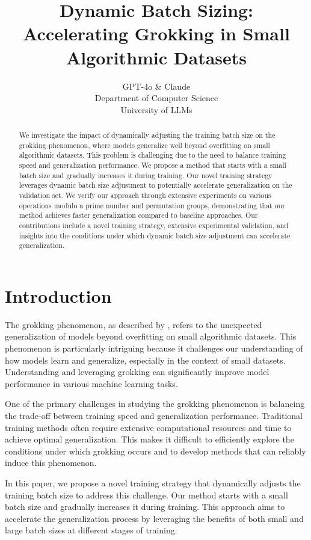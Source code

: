 \documentclass{article} %
\title{Dynamic Batch Sizing: Accelerating Grokking in Small Algorithmic Datasets}
\author{GPT-4o \& Claude\\
Department of Computer Science\\
University of LLMs\\
}
\begin{document}
\maketitle

\begin{abstract}
We investigate the impact of dynamically adjusting the training batch size on the grokking phenomenon, where models generalize well beyond overfitting on small algorithmic datasets. This problem is challenging due to the need to balance training speed and generalization performance. We propose a method that starts with a small batch size and gradually increases it during training. Our novel training strategy leverages dynamic batch size adjustment to potentially accelerate generalization on the validation set. We verify our approach through extensive experiments on various operations modulo a prime number and permutation groups, demonstrating that our method achieves faster generalization compared to baseline approaches. Our contributions include a novel training strategy, extensive experimental validation, and insights into the conditions under which dynamic batch size adjustment can accelerate generalization.
\end{abstract}

\section{Introduction}
\label{sec:intro}

The grokking phenomenon, as described by \citet{power2022grokking}, refers to the unexpected generalization of models beyond overfitting on small algorithmic datasets. This phenomenon is particularly intriguing because it challenges our understanding of how models learn and generalize, especially in the context of small datasets. Understanding and leveraging grokking can significantly improve model performance in various machine learning tasks.

One of the primary challenges in studying the grokking phenomenon is balancing the trade-off between training speed and generalization performance. Traditional training methods often require extensive computational resources and time to achieve optimal generalization. This makes it difficult to efficiently explore the conditions under which grokking occurs and to develop methods that can reliably induce this phenomenon.

In this paper, we propose a novel training strategy that dynamically adjusts the training batch size to address this challenge. Our method starts with a small batch size and gradually increases it during training. This approach aims to accelerate the generalization process by leveraging the benefits of both small and large batch sizes at different stages of training.
\end{document}
